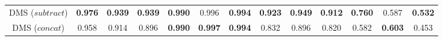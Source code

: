 \begin{tabular}{ccccccccccccc}
DMS ($subtract$)
& \textbf{	0.976}	&	\textbf{0.939}	&	\textbf{0.939}	&	\textbf{0.990}	&0.996	&	\textbf{0.994}	& \textbf{0.923}	&\textbf{	0.949}	&	\textbf{0.912}	&	\textbf{0.760}	&	0.587	&	\textbf{0.532}	\\		

DMS ($concat$)
& 0.958		& 0.914		& 0.896		&	\textbf{0.990}	&	\textbf{0.997}	&\textbf{	0.994}	& 0.832		&	0.896	& 0.820		& 0.582	& \textbf{0.603}	&	0.453	\\		


\hline							
\end{tabular}	


